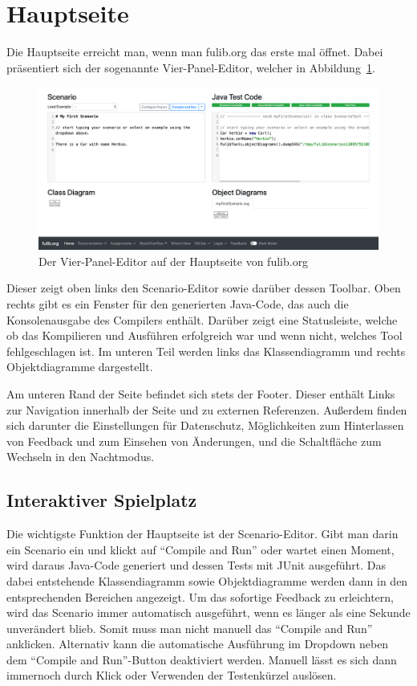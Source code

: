 \section{Hauptseite}\label{sec:main-page}

Die Hauptseite erreicht man, wenn man fulib.org das erste mal öffnet.
Dabei präsentiert sich der sogenannte Vier-Panel-Editor, welcher in Abbildung~\ref{fig:four-pane-editor}.

\begin{figure}
    \includegraphics[width=\textwidth]{chapter/fulib.org/img/four-pane-editor.png}
    \caption{Der Vier-Panel-Editor auf der Hauptseite von fulib.org}
    \label{fig:four-pane-editor}
\end{figure}

Dieser zeigt oben links den Scenario-Editor sowie darüber dessen Toolbar.
Oben rechts gibt es ein Fenster für den generierten Java-Code, das auch die Konsolenausgabe des Compilers enthält.
Darüber zeigt eine Statusleiste, welche ob das Kompilieren und Ausführen erfolgreich war und wenn nicht, welches Tool fehlgeschlagen ist.
Im unteren Teil werden links das Klassendiagramm und rechts Objektdiagramme dargestellt.

Am unteren Rand der Seite befindet sich stets der Footer.
Dieser enthält Links zur Navigation innerhalb der Seite und zu externen Referenzen.
Außerdem finden sich darunter die Einstellungen für Datenschutz,
Möglichkeiten zum Hinterlassen von Feedback und zum Einsehen von Änderungen,
und die Schaltfläche zum Wechseln in den Nachtmodus.

\subsection{Interaktiver Spielplatz}\label{subsec:interactive-playground}

Die wichtigste Funktion der Hauptseite ist der Scenario-Editor.
Gibt man darin ein Scenario ein und klickt auf ``Compile and Run'' oder wartet einen Moment,
wird daraus Java-Code generiert und dessen Tests mit JUnit ausgeführt.
Das dabei entstehende Klassendiagramm sowie Objektdiagramme werden dann in den entsprechenden Bereichen angezeigt.
Um das sofortige Feedback zu erleichtern, wird das Scenario immer automatisch ausgeführt, wenn es länger als eine Sekunde unverändert blieb.
Somit muss man nicht manuell das ``Compile and Run'' anklicken.
Alternativ kann die automatische Ausführung im Dropdown neben dem ``Compile and Run''-Button deaktiviert werden.
Manuell lässt es sich dann immernoch durch Klick oder Verwenden der Testenkürzel auslösen.

